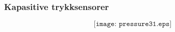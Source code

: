 \documentclass[aspectratio=169,xcolor=dvipsnames]{beamer}
\begin{document}
%
%
%
%
%
%
%
%
%
%
%
%
\begin{frame}
	\frametitle{Kapasitive trykksensorer}

	$$\texttt{[image: pressure31.eps]}$$
\end{frame}
\end{document}

